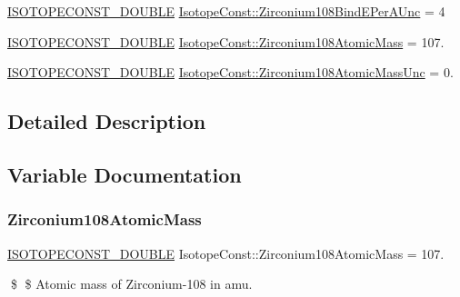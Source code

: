 \begin{DoxyCompactItemize}
\mbox{\hyperlink{group___isotope_const-_macros_ga8f45a7272ce02c0b4c65c44636ed719a}{I\+S\+O\+T\+O\+P\+E\+C\+O\+N\+S\+T\+\_\+\+D\+O\+U\+B\+LE}} \mbox{\hyperlink{group___isotope_const-_zirconium-_zr108_ga8a2e3545b68822d9dc5b6f2645e8ff6d}{Isotope\+Const\+::\+Zirconium108\+Bind\+E\+Per\+A\+Unc}} = 4
\item 
\mbox{\hyperlink{group___isotope_const-_macros_ga8f45a7272ce02c0b4c65c44636ed719a}{I\+S\+O\+T\+O\+P\+E\+C\+O\+N\+S\+T\+\_\+\+D\+O\+U\+B\+LE}} \mbox{\hyperlink{group___isotope_const-_zirconium-_zr108_ga90a970ed929a6775e326da15c37c74ef}{Isotope\+Const\+::\+Zirconium108\+Atomic\+Mass}} = 107.
\item 
\mbox{\hyperlink{group___isotope_const-_macros_ga8f45a7272ce02c0b4c65c44636ed719a}{I\+S\+O\+T\+O\+P\+E\+C\+O\+N\+S\+T\+\_\+\+D\+O\+U\+B\+LE}} \mbox{\hyperlink{group___isotope_const-_zirconium-_zr108_ga0a3f6aec2e24f4cb3b7b6613fb908b58}{Isotope\+Const\+::\+Zirconium108\+Atomic\+Mass\+Unc}} = 0.
\end{DoxyCompactItemize}


\subsection{Detailed Description}


\subsection{Variable Documentation}
\mbox{\label{group___isotope_const-_zirconium-_zr108_ga90a970ed929a6775e326da15c37c74ef}} 
\subsubsection{\texorpdfstring{Zirconium108\+Atomic\+Mass}{Zirconium108AtomicMass}}
{\footnotesize\ttfamily \mbox{\hyperlink{group___isotope_const-_macros_ga8f45a7272ce02c0b4c65c44636ed719a}{I\+S\+O\+T\+O\+P\+E\+C\+O\+N\+S\+T\+\_\+\+D\+O\+U\+B\+LE}} Isotope\+Const\+::\+Zirconium108\+Atomic\+Mass = 107.}

\$ \$ Atomic mass of Zirconium-\/108 in amu. \mbox{\label{group___isotope_const-_zirconium-_zr108_ga0a3f6aec2e24f4cb3b7b6613fb908b58}} 

